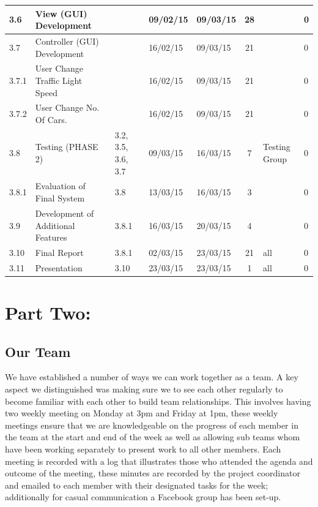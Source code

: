 \documentclass[a4paper,11pt]{article}
\begin{document}
\begin{table}[ht]
\begin{adjustwidth}{-2cm}{}
\begin{tabular}{|m{0.8cm}|m{6cm}|m{2.3cm}|m{1.3cm}|m{1.3cm}|c|m{2.6cm}|m{0.5cm}|}
			3.6 & View (GUI) Development &  & 09/02/15 & 09/03/15 & 28 &  & 0 \\\hline 
			3.7 & Controller (GUI) Development  &  & 16/02/15 & 09/03/15 & 21 &  & 0 \\\hline 
			3.7.1 & User Change Traffic Light Speed  &  & 16/02/15 & 09/03/15 & 21 &  & 0 \\\hline 
			3.7.2 & User Change No. Of Cars.  &  & 16/02/15 & 09/03/15 & 21 &  & 0 \\\hline 
			3.8 & Testing (PHASE 2)  & 3.2, 3.5, 3.6, 3.7 & 09/03/15 & 16/03/15 & 7 & Testing Group & 0 \\\hline 
			3.8.1 & Evaluation of Final System  & 3.8 & 13/03/15 & 16/03/15 & 3 &  & 0 \\\hline 
			3.9 & Development of Additional Features & 3.8.1 & 16/03/15 & 20/03/15 & 4 &  & 0 \\\hline 
			3.10 & Final Report & 3.8.1 & 02/03/15 & 23/03/15 & 21 & all & 0 \\\hline 
			3.11 & Presentation & 3.10 & 23/03/15 & 23/03/15 & 1 & all & 0 \\ \hline 
		\end{tabular}
			\label{table:plan}
	\end{adjustwidth}
\end{table}

\section[short]{Part Two:}
\subsection{Our Team}%
We have established a number of ways we can work together as a team. A key aspect we distinguished was making sure we to see each other regularly to become familiar with each other to build team relationships. This involves having two weekly meeting on Monday at 3pm and Friday at 1pm, these weekly meetings ensure that we are knowledgeable on the progress of each member in the team at the start and end of the week as well as allowing sub teams whom have been working separately to present work to all other members. Each meeting is recorded with a log that illustrates those who attended the agenda and outcome of the meeting, these minutes are recorded by the project coordinator and emailed to each member with their designated tasks for the week; additionally for casual communication a Facebook group has been set-up.
\end{document}
